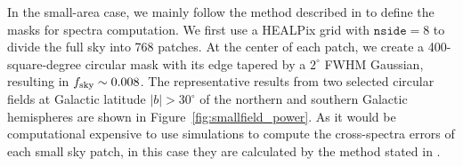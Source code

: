 \documentclass[twocolumn]{aastex631}
\begin{document}
In the small-area case, we mainly follow the method described in \cite{planck2014-XXX} to define the masks for spectra computation. We first use a HEALPix grid with $\texttt{nside} = 8$ to divide the full sky into 768 patches. At the center of each patch, we create a 400-square-degree circular mask with its edge tapered by a $2^\circ$ FWHM Gaussian, resulting in $f_{\rm sky} \sim 0.008$. The representative results from two selected circular fields at Galactic latitude $|b| > 30^\circ$ of the northern and southern Galactic hemispheres are shown in Figure~\ref{fig:smallfield_power}. As it would be computational expensive to use simulations to compute the cross-spectra errors of each small sky patch, in this case they are calculated by the method stated in \cite{Tristram:2005}. 

\end{document}
